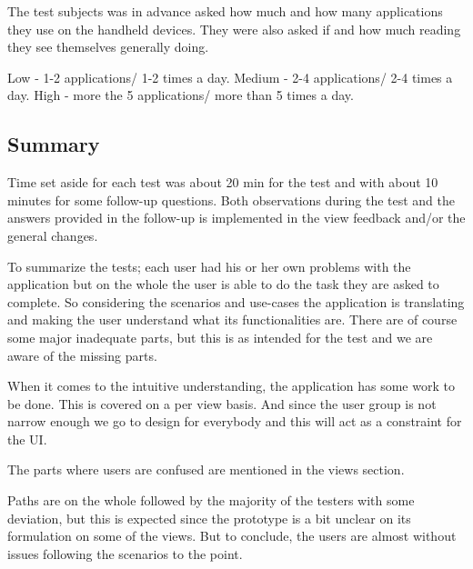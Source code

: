 			The test subjects was in advance  asked how much and how many applications they use on the handheld devices. They were also asked if and how much reading they see themselves generally doing.
			
			Low - 1-2 applications/ 1-2 times a day.
			Medium - 2-4 applications/ 2-4 times a day.
			High - more the 5 applications/ more than 5 times a day.
			
			
			\subsection{Summary}
			Time set aside for each test was about 20 min for the test and with about 10 minutes for some follow-up questions. Both observations during the test and the answers provided in the follow-up is implemented in the view feedback and/or the general changes.
			
			To summarize the tests; each user had his or her own problems with the application but on the whole the user is able to do the task they are asked to complete. So considering the scenarios and use-cases the application is translating and making the user understand what its functionalities are. There are of course some major inadequate parts, but this is as intended for the test and we are aware of the missing parts.
			
			When it comes to the intuitive understanding, the application has some work to be done. This is covered on a per view basis. And since the user group is not narrow enough we go to design for everybody and this will act as a constraint for the UI. 
			
			The parts where users are confused are mentioned in the views section.
			
			Paths are on the whole followed by the majority of the testers with some deviation, but this is expected since the prototype is a bit unclear on its formulation on some of the views. But to conclude, the users are almost without issues following the scenarios to the point.
			
